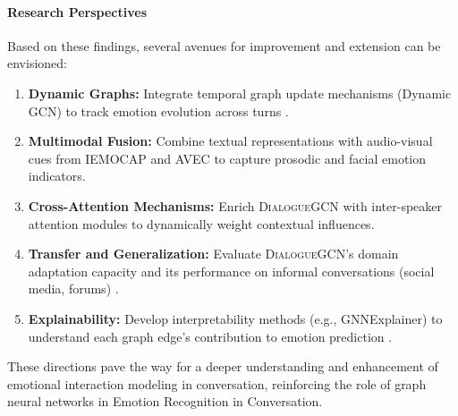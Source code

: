 \documentclass[a4paper,11pt]{article}
\begin{document}
\paragraph{Research Perspectives}
Based on these findings, several avenues for improvement and extension can be envisioned:
\begin{enumerate}
  \item \textbf{Dynamic Graphs:} Integrate temporal graph update mechanisms (Dynamic GCN) to track emotion evolution across turns \cite{zhao2021multi}.  
  \item \textbf{Multimodal Fusion:} Combine textual representations with audio-visual cues from IEMOCAP and AVEC \cite{chen2017multimodal} to capture prosodic and facial emotion indicators.  
  \item \textbf{Cross-Attention Mechanisms:} Enrich \textsc{DialogueGCN} with inter-speaker attention modules \cite{vaswani2017attention} to dynamically weight contextual influences.  
  \item \textbf{Transfer and Generalization:} Evaluate \textsc{DialogueGCN}’s domain adaptation capacity and its performance on informal conversations (social media, forums) \cite{pennington2014glove}.  
  \item \textbf{Explainability:} Develop interpretability methods (e.g., GNNExplainer) to understand each graph edge’s contribution to emotion prediction \cite{velickovic2017graph}.  
\end{enumerate}

These directions pave the way for a deeper understanding and enhancement of emotional interaction modeling in conversation, reinforcing the role of graph neural networks in Emotion Recognition in Conversation.

\newpage



\end{document}
